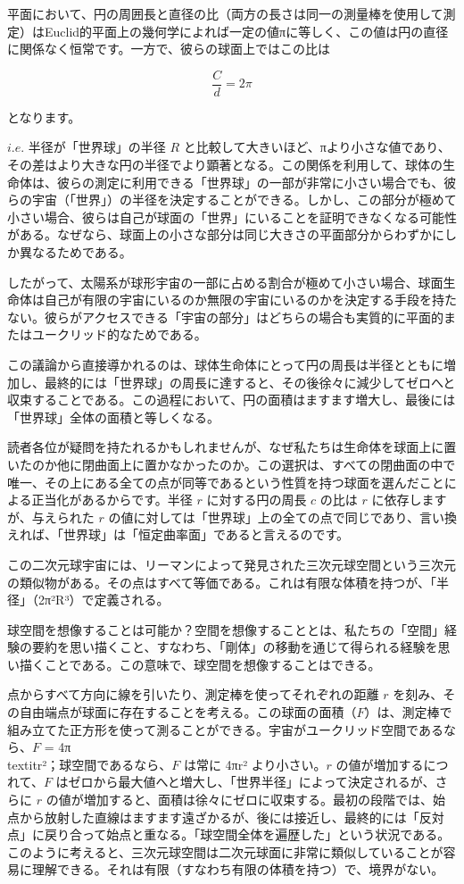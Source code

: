 \documentclass[a4paper,11pt,openany]{ltjsbook}
\begin{document}
平面において、円の周囲長と直径の比（両方の長さは同一の測量棒を使用して測定）はEuclid的平面上の幾何学によれば一定の値πに等しく、この値は円の直径に関係なく恒常です。一方で、彼らの球面上ではこの比は

\[ \frac{C}{d} = 2\pi \]

となります。

$i.e.$ 半径が「世界球」の半径 \( R \) と比較して大きいほど、πより小さな値であり、その差はより大きな円の半径でより顕著となる。この関係を利用して、球体の生命体は、彼らの測定に利用できる「世界球」の一部が非常に小さい場合でも、彼らの宇宙（「世界」）の半径を決定することができる。しかし、この部分が極めて小さい場合、彼らは自己が球面の「世界」にいることを証明できなくなる可能性がある。なぜなら、球面上の小さな部分は同じ大きさの平面部分からわずかにしか異なるためである。

したがって、太陽系が球形宇宙の一部に占める割合が極めて小さい場合、球面生命体は自己が有限の宇宙にいるのか無限の宇宙にいるのかを決定する手段を持たない。彼らがアクセスできる「宇宙の部分」はどちらの場合も実質的に平面的またはユークリッド的なためである。

この議論から直接導かれるのは、球体生命体にとって円の周長は半径とともに増加し、最終的には「世界球」の周長に達すると、その後徐々に減少してゼロへと収束することである。この過程において、円の面積はますます増大し、最後には「世界球」全体の面積と等しくなる。

読者各位が疑問を持たれるかもしれませんが、なぜ私たちは生命体を球面上に置いたのか他に閉曲面上に置かなかったのか。この選択は、すべての閉曲面の中で唯一、その上にある全ての点が同等であるという性質を持つ球面を選んだことによる正当化があるからです。半径 \( r \) に対する円の周長 \( c \) の比は \( r \) に依存しますが、与えられた \( r \) の値に対しては「世界球」上の全ての点で同じであり、言い換えれば、「世界球」は「恒定曲率面」であると言えるのです。

この二次元球宇宙には、リーマンによって発見された三次元球空間という三次元の類似物がある。その点はすべて等価である。これは有限な体積を持つが、「半径」（2π²R³）で定義される。

球空間を想像することは可能か？空間を想像することとは、私たちの「空間」経験の要約を思い描くこと、すなわち、「剛体」の移動を通じて得られる経験を思い描くことである。この意味で、球空間を想像することはできる。

点からすべて方向に線を引いたり、測定棒を使ってそれぞれの距離 $r$ を刻み、その自由端点が球面に存在することを考える。この球面の面積（$F$）は、測定棒で組み立てた正方形を使って測ることができる。宇宙がユークリッド空間であるなら、$F$ = 4π\\textit{r²；球空間であるなら、$F$ は常に 4π}r² より小さい。$r$ の値が増加するにつれて、$F$ はゼロから最大値へと増大し、「世界半径」によって決定されるが、さらに $r$ の値が増加すると、面積は徐々にゼロに収束する。最初の段階では、始点から放射した直線はますます遠ざかるが、後には接近し、最終的には「反対点」に戻り合って始点と重なる。「球空間全体を遍歴した」という状況である。このように考えると、三次元球空間は二次元球面に非常に類似していることが容易に理解できる。それは有限（すなわち有限の体積を持つ）で、境界がない。
\end{document}
